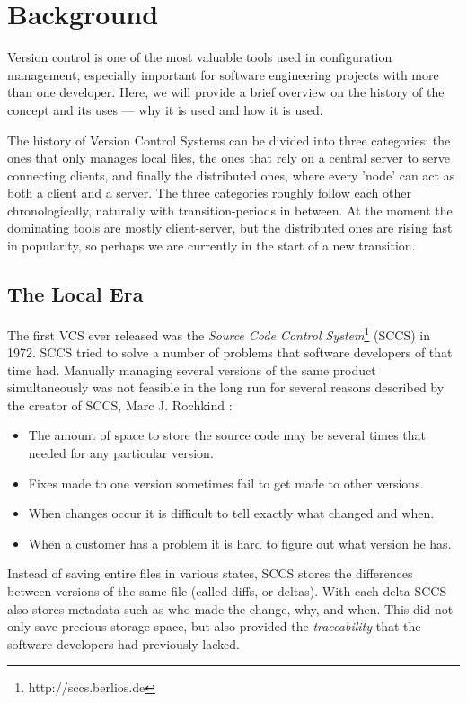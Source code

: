 \documentclass{llncs}
\begin{document}
\section{Background}
\label{sec:background}

Version control is one of the most valuable tools used in
configuration management, especially important for software
engineering projects with more than one developer. Here, we will
provide a brief overview on the history of the concept and its uses
--- why it is used and how it is used.

The history of Version Control Systems can be divided into three
categories; the ones that only manages local files, the ones that rely
on a central server to serve connecting clients, and finally the
distributed ones, where every 'node' can act as both a client and a
server. The three categories roughly follow each other
chronologically, naturally with transition-periods in between. At the
moment the dominating tools are mostly client-server, but the
distributed ones are rising fast in popularity, so perhaps we are
currently in the start of a new transition.

\subsection{The Local Era}
The first VCS ever released was the \emph{Source Code Control
  System}\footnote{http://sccs.berlios.de} (SCCS) in 1972. SCCS tried
to solve a number of problems that software developers of that time
had. Manually managing several versions of the same product
simultaneously was not feasible in the long run for several reasons
described by the creator of SCCS, Marc J. Rochkind \cite{rochkind75}:

\begin{itemize}
 \item The amount of space to store the source code may be several
       times that needed for any particular version.
 \item Fixes made to one version sometimes fail to get made to
       other versions.
 \item When changes occur it is difficult to tell exactly what changed
       and when.
 \item When a customer has a problem it is hard to figure out what
       version he has.
\end{itemize}

Instead of saving entire files in various states, SCCS stores the
differences between versions of the same file (called diffs, or
deltas\cite{ambriola90}). With each delta SCCS also stores metadata
such as who made the change, why, and when. This did not only save
precious storage space, but also provided the \emph{traceability} that
the software developers had previously lacked\cite{rochkind75}.
\end{document}
